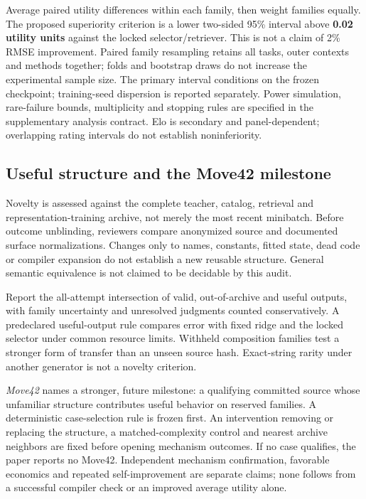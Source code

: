 Average paired utility differences within each family, then weight families
equally. The proposed superiority criterion is a lower two-sided 95\% interval
above \textbf{0.02 utility units} against the locked selector/retriever. This is
not a claim of 2\% RMSE improvement. Paired family resampling retains all tasks,
outer contexts and methods together; folds and bootstrap draws do not increase
the experimental sample size. The primary interval conditions on the frozen
checkpoint; training-seed dispersion is reported separately. Power simulation,
rare-failure bounds, multiplicity and stopping rules are specified in the
supplementary analysis contract. Elo is secondary and panel-dependent; overlapping
rating intervals do not establish noninferiority.

\subsection{Useful structure and the Move42 milestone}

Novelty is assessed against the complete teacher, catalog, retrieval and
representation-training archive, not merely the most recent minibatch. Before
outcome unblinding, reviewers compare anonymized source and documented surface
normalizations. Changes only to names, constants, fitted state, dead code or
compiler expansion do not establish a new reusable structure. General semantic
equivalence is not claimed to be decidable by this audit.

Report the all-attempt intersection of valid, out-of-archive and useful outputs,
with family uncertainty and unresolved judgments counted conservatively. A
predeclared useful-output rule compares error with fixed ridge and the locked
selector under common resource limits. Withheld composition families test a
stronger form of transfer than an unseen source hash. Exact-string rarity under
another generator is not a novelty criterion.

\emph{Move42} names a stronger, future milestone: a qualifying committed source
whose unfamiliar structure contributes useful behavior on reserved families.
A deterministic case-selection rule is frozen first. An intervention removing or
replacing the structure, a matched-complexity control and nearest archive
neighbors are fixed before opening mechanism outcomes. If no case qualifies,
the paper reports no Move42. Independent mechanism confirmation, favorable
economics and repeated self-improvement are separate claims; none follows from
a successful compiler check or an improved average utility alone.
